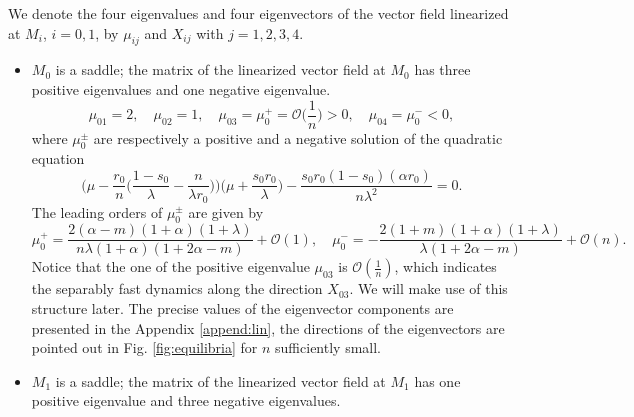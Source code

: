 \documentclass[a4paper,11pt]{article}
\def\BO{{\mathcal{O}}}
\theoremstyle{remark}
\begin{document}
We denote the four eigenvalues and four eigenvectors of the vector field linearized at $M_i$, $i=0,1$,  by $\mu_{ij}$ and $X_{ij}$ with $j=1,2,3,4$. %
\begin{itemize}
 \item $M_0$ is a saddle; the matrix of the linearized vector field at $M_0$ has three positive eigenvalues and one negative eigenvalue. 
 \begin{equation} \label{eq:eigM0}
  \mu_{01} = 2, \quad \mu_{02}=1, \quad \mu_{03}=\mu_0^+=\BO\Big(\frac{1}{n}\Big)>0, \quad \mu_{04}=\mu_0^{-}<0,
 \end{equation}
  where $\mu_0^\pm$ are respectively a positive and a negative solution of the quadratic equation
 $$ \Big(\mu - \frac{r_0}{n}\Big(\frac{1-s_0}{\lambda}-\frac{n}{\lambda r_0}\Big)\Big)\Big(\mu + \frac{s_0r_0}{\lambda}\Big) -
 \frac{s_0r_0(1-s_0)(\alpha r_0)}{n\lambda^2} = 0.$$%
The leading orders of $\mu_0^\pm$ are given by
$$\mu_0^+ = \frac{2(\alpha-m)(1+\alpha)(1+\lambda)}{n\lambda(1+\alpha)(1+2\alpha-m)}+\BO(1), \quad\mu_0^- = -\frac{2(1+m)(1+\alpha)(1+\lambda)}{\lambda(1+2\alpha-m)}  + \BO(n).$$
Notice that the one of the positive eigenvalue $\mu_{03}$ is $\mathcal{O}( \frac{1}{n})$, which indicates the separably fast dynamics along the direction $X_{03}$. We will make use of this structure later.
The precise values of the eigenvector components are presented in the Appendix \ref{append:lin}, the directions of the eigenvectors are
pointed out in Fig. \ref{fig:equilibria} for $n$ sufficiently small.
 \item $M_1$ is a saddle; the matrix of the linearized vector field at $M_1$ has one positive eigenvalue and three negative eigenvalues. 

\end{itemize}
\end{document}
